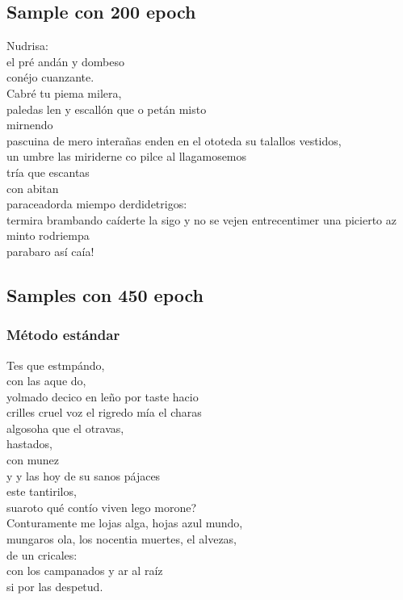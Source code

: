 \documentclass[11pt,letterpaper]{article}
\begin{document}
\subsection{Sample con 200 epoch}
\begin{center}
\parbox{0.5\linewidth} {
Nudrisa:\\
el pré andán y dombeso\\
conéjo cuanzante.\\
Cabré tu piema milera,\\
paledas len y escallón que o petán misto\\
mirnendo\\
pascuina de mero interañas enden en el ototeda su talallos vestidos,\\
un umbre las miriderne co pilce al llagamosemos\\
tría que escantas\\
con abitan\\
paraceadorda miempo derdidetrigos:\\
termira brambando caíderte la sigo y no se vejen entrecentimer una picierto az minto rodriempa\\
parabaro así caía!\\
}
\end{center}

\subsection{Samples con 450 epoch}
\subsubsection{Método estándar}
\begin{center}
\parbox{0.5\linewidth} {
Tes que estmpándo,\\
con las aque do,\\
yolmado decico en leño por taste hacio\\
crilles cruel voz el rigredo mía el charas\\
algosoha que el otravas,\\
hastados,\\
con munez\\
y y las hoy de su sanos pájaces\\
este tantirilos,\\
suaroto qué contío viven lego morone?\\

Conturamente me lojas alga, hojas azul mundo,\\
mungaros ola, los nocentia muertes, el alvezas,\\
de un cricales:\\
con los campanados y ar al raíz\\
si por las despetud.\\
}
\end{center}
\end{document}
